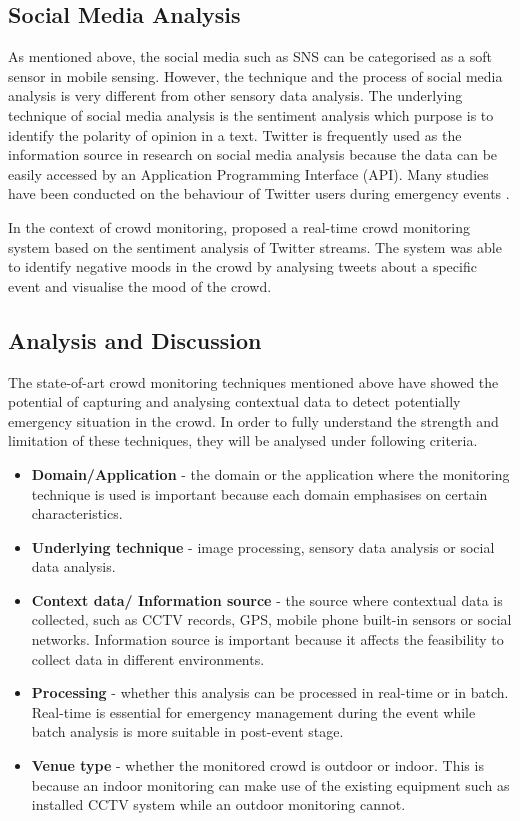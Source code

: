 \subsection{Social Media Analysis}
As mentioned above, the social media such as SNS can be categorised as a soft sensor in mobile sensing. However, the technique and the process of social media analysis is very different from other sensory data analysis. The underlying technique of social media analysis is the sentiment analysis which purpose is to identify the polarity of opinion in a text. Twitter is frequently used as the information source in research on social media analysis because the data can be easily accessed by an Application Programming Interface (API). Many studies have been conducted on the behaviour of Twitter users during emergency events \citep{Hughes2009,Sakaki2010,Vieweg2010,Yin2012}.

In the context of crowd monitoring, \citet{DelirHaghighi2013} proposed a real-time crowd monitoring system based on the sentiment analysis of Twitter streams. The system was able to identify negative moods in the crowd by analysing tweets about a specific event and visualise the mood of the crowd.

\subsection{Analysis and Discussion}
The state-of-art crowd monitoring techniques mentioned above have showed the potential of capturing and analysing contextual data to detect potentially emergency situation in the crowd. In order to fully understand the strength and limitation of these techniques, they will be analysed under following criteria.

\begin{itemize}
	\item \textbf{Domain/Application} - the domain or the application where the monitoring technique is used is important because each domain emphasises on certain characteristics. 
	\item \textbf{Underlying technique} - image processing, sensory data analysis or social data analysis.
	\item \textbf{Context data/ Information source} - the source where contextual data is collected, such as CCTV records, GPS, mobile phone built-in sensors or social networks. Information source is important because it affects the feasibility to collect data in different environments.
	\item \textbf{Processing} - whether this analysis can be processed in real-time or in batch. Real-time is essential for emergency management during the event while batch analysis is more suitable in post-event stage.
	\item \textbf{Venue type} - whether the monitored crowd is outdoor or indoor. This is because an indoor monitoring can make use of the existing equipment such as installed CCTV system while an outdoor monitoring cannot.
\end{itemize}

